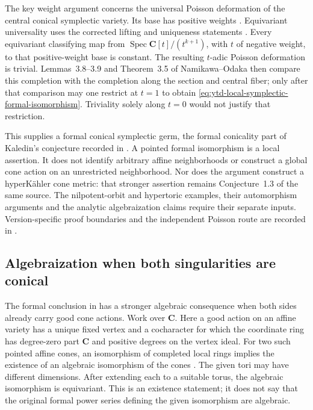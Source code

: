 The key weight argument concerns the universal Poisson deformation
of the central conical symplectic variety. Its base has positive
weights \cite[Section~5.4]{Namikawa11AffinePoissonV7}.
Equivariant universality uses the corrected lifting and uniqueness
statements \cite[Theorem~2.1, Proposition~2.3 and
Corollary~2.4]{Namikawa26PoissonCorrectionsV2}.
Every equivariant classifying map from
$\operatorname{Spec}\mathbf C[t]/(t^{k+1})$, with $t$ of negative
weight, to that positive-weight base is constant. The resulting
$t$-adic Poisson deformation is trivial. Lemmas~3.8--3.9 and
Theorem~3.5 of Namikawa--Odaka then compare this completion with
the completion along the section and central fiber; only after
that comparison may one restrict at $t=1$ to obtain
\eqref{eq:ytd-local-symplectic-formal-isomorphism}.
Triviality solely along $t=0$ would not justify that restriction.

This supplies a formal conical symplectic germ, the formal
conicality part of Kaledin's conjecture recorded in
\cite[Corollary~6.3]{XuZhuang26StableFormsV2}. A pointed formal
isomorphism is a local assertion. It does not identify arbitrary
affine neighborhoods or construct a global cone action on an
unrestricted neighborhood. Nor does the argument construct a
hyperK\"ahler cone metric: that stronger assertion remains
Conjecture~1.3 of the same source. The nilpotent-orbit and hypertoric
examples, their automorphism arguments and the analytic
algebraization claims require their separate inputs.
Version-specific proof boundaries and the independent Poisson route
are recorded in .

\subsection{Algebraization when both singularities are conical}
\label{sec:ytd-local-symplectic-algebraization}

The formal conclusion in
 has a stronger
algebraic consequence when both sides already carry good cone
actions. Work over $\mathbf C$. Here a good action on an affine
variety has a unique fixed vertex and a cocharacter for which
the coordinate ring has degree-zero part $\mathbf C$ and positive
degrees on the vertex ideal. For two such pointed affine cones,
an isomorphism of completed local rings implies the existence
of an algebraic isomorphism of the cones
\cite[Lemma~6.4]{XuZhuang26StableFormsV2}.
The given tori may have different dimensions. After extending
each to a suitable torus, the algebraic isomorphism is equivariant.
This is an existence statement; it does not say that the original
formal power series defining the given isomorphism are algebraic.

